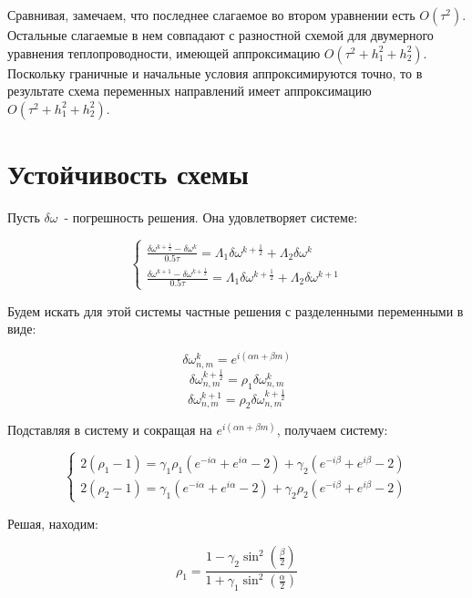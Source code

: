 \documentclass[12pt]{article}
\begin{document}
		Сравнивая, замечаем, что последнее слагаемое во втором уравнении есть $O(\tau^2)$. Остальные слагаемые в нем совпадают с разностной схемой для двумерного уравнения теплопроводности, имеющей аппроксимацию $O(\tau^2 + h_1^2 + h_2^2)$. Поскольку граничные и начальные условия аппроксимируются точно, то в результате схема переменных направлений имеет аппроксимацию $O(\tau^2 + h_1^2 + h_2^2)$.
		
	\section{Устойчивость схемы}
		Пусть $\delta \omega$\ - погрешность решения. Она удовлетворяет системе:
		
		\begin{equation}
			\begin{cases}
				\frac{\delta \omega^{k+\frac{1}{2}} - \delta \omega^k}{0.5\tau} = \Lambda_1 \delta\omega^{k + \frac{1}{2}} + \Lambda_2 \delta\omega^k\\
										
				\frac{ \delta\omega^{k+1} - \delta\omega^{k+\frac{1}{2}}}{0.5\tau} = \Lambda_1 \delta\omega^{k + \frac{1}{2}} + \Lambda_2 \delta\omega^{k+1}
			\end{cases}
		\end{equation}
		
		Будем искать для этой системы частные решения с разделенными переменными в виде:
		
		$$\delta\omega^k_{n,m} = e^{i(\alpha n + \beta m)}$$
		$$\delta\omega^{k+\frac{1}{2}}_{n,m} = \rho_1 \delta\omega^k_{n,m}$$
		$$\delta\omega^{k+1}_{n,m} = \rho_2\delta\omega^{k+\frac{1}{2}}_{n,m}$$
		
		Подставляя в систему и сокращая на $e^{i(\alpha n + \beta m)}$, получаем систему:
		
		\begin{equation}
			\begin{cases}
				2(\rho_1 -1) = \gamma_1 \rho_1 (e^{-i\alpha} + e^{i\alpha} -2) + \gamma_2 (e^{-i\beta} + e^{i\beta} -2) \\
				2(\rho_2 -1) = \gamma_1 (e^{-i\alpha} + e^{i\alpha} -2) + \gamma_2 \rho_2 (e^{-i\beta} + e^{i\beta} -2)
			\end{cases}
		\end{equation}
		
		Решая, находим:
		
		$$\rho_1 = \frac{1 - \gamma_2 \sin^2 \left( \frac{\beta}{2} \right)}{1 + \gamma_1 \sin^2 \left( \frac{\alpha}{2} \right)}$$
		
\end{document}
